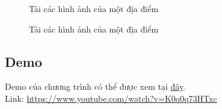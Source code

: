 \begin{figure}[H]
\caption{Tải các hình ảnh của một địa điểm}
\label{img2}
\end{figure}

\begin{figure}[H]
\caption{Tải các hình ảnh của một địa điểm}
\label{img3}
\end{figure}

\subsection{Demo}
Demo của chương trình có thể được xem tại \href{https://youtu.be/K0q0q73HTxc}{đây}.\\
Link: \url{https://www.youtube.com/watch?v=K0q0q73HTxc}
